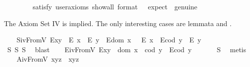 \begin{isabellebody}
\ \ \isanewline
\ \ \ \ \isamarkupfalse%
\ {\isacharbrackleft}satisfy{\isacharcomma}\ user{\isacharunderscore}axioms{\isacharcomma}\ show{\isacharunderscore}all{\isacharcomma}\ format\ {\isacharequal}\ {}{\isacharcomma}\ expect\ {\isacharequal}\ genuine{\isacharbrackright}%
\isadelimproof
\ %
\endisadelimproof
%
\isatagproof
{}\isamarkupfalse%
%
\endisatagproof
{\isafoldproof}%
%
\isadelimproof
%
\endisadelimproof
%
\begin{isamarkuptext}%
The Axiom Set IV is implied. The only interesting cases are 
 lemmata  and .%
\end{isamarkuptext}\isamarkuptrue%
\ \ \isamarkupfalse%
\ S\isactrlsub i\isactrlsub vFromV{\isacharcolon}\ {\isachardoublequoteopen}{\isacharparenleft}E{\isacharparenleft}x{\isasymcdot}y{\isacharparenright}\ \isactrlbold {\isasymrightarrow}\ {\isacharparenleft}E\ x\ \isactrlbold {\isasymand}\ E\ y{\isacharparenright}{\isacharparenright}\ \isactrlbold {\isasymand}\ {\isacharparenleft}E{\isacharparenleft}dom\ x\ {\isacharparenright}\ \isactrlbold {\isasymrightarrow}\ E\ x{\isacharparenright}\ \isactrlbold {\isasymand}\ {\isacharparenleft}E{\isacharparenleft}cod\ y{\isacharparenright}\ \isactrlbold {\isasymrightarrow}\ E\ y{\isacharparenright}{\isachardoublequoteclose}\ \ \ \isanewline
%
\isadelimproof
\ \ \ \ %
\endisadelimproof
%
\isatagproof
{}\isamarkupfalse%
\ S{}\ S{}\ S{}\ \isamarkupfalse%
\ blast%
\endisatagproof
{\isafoldproof}%
%
\isadelimproof
\isanewline
%
\endisadelimproof
\ \ \isamarkupfalse%
\ E\isactrlsub i\isactrlsub vFromV{\isacharcolon}\ {\isachardoublequoteopen}E{\isacharparenleft}x{\isasymcdot}y{\isacharparenright}\ \isactrlbold {\isasymleftrightarrow}\ {\isacharparenleft}dom\ x\ {\isasymcong}\ cod\ y\ \isactrlbold {\isasymand}\ E{\isacharparenleft}cod\ y{\isacharparenright}{\isacharparenright}{\isachardoublequoteclose}\ \isanewline
%
\isadelimproof
\ \ \ \ %
\endisadelimproof
%
\isatagproof
{}\isamarkupfalse%
\ S{}\ \isamarkupfalse%
\ metis%
\endisatagproof
{\isafoldproof}%
%
\isadelimproof
\isanewline
%
\endisadelimproof
\ \ \isamarkupfalse%
\ A\isactrlsub i\isactrlsub vFromV{\isacharcolon}\ {\isachardoublequoteopen}x{\isasymcdot}{\isacharparenleft}y{\isasymcdot}z{\isacharparenright}\ {\isasymcong}\ {\isacharparenleft}x{\isasymcdot}y{\isacharparenright}{\isasymcdot}z{\isachardoublequoteclose}\ \isanewline

\end{isabellebody}
